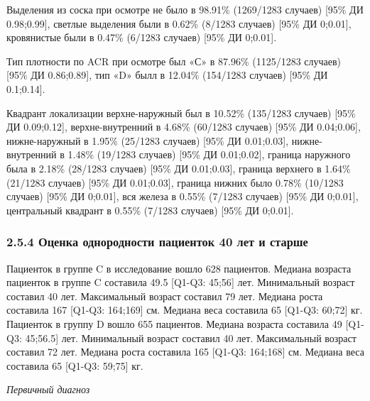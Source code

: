 \documentclass[
]{article}
\begin{document}
Выделения из соска при осмотре не было в 98.91\% (1269/1283 случаев)
{[}95\% ДИ 0.98;0.99{]}, светлые выделения были в 0.62\% (8/1283
случаев) {[}95\% ДИ 0;0.01{]}, кровянистые были в 0.47\% (6/1283
случаев) {[}95\% ДИ 0;0.01{]}.

Тип плотности по ACR при осмотре был «С» в 87.96\% (1125/1283 случаев)
{[}95\% ДИ 0.86;0.89{]}, тип «D» былл в 12.04\% (154/1283 случаев)
{[}95\% ДИ 0.1;0.14{]}.

Квадрант локализации верхне-наружный был в 10.52\% (135/1283 случаев)
{[}95\% ДИ 0.09;0.12{]}, верхне-внутренний в 4.68\% (60/1283 случаев)
{[}95\% ДИ 0.04;0.06{]}, нижне-наружный в 1.95\% (25/1283 случаев)
{[}95\% ДИ 0.01;0.03{]}, нижне-внутренний в 1.48\% (19/1283 случаев)
{[}95\% ДИ 0.01;0.02{]}, граница наружного была в 2.18\% (28/1283
случаев) {[}95\% ДИ 0.01;0.03{]}, граница верхнего в 1.64\% (21/1283
случаев) {[}95\% ДИ 0.01;0.03{]}, граница нижних было 0.78\% (10/1283
случаев) {[}95\% ДИ 0;0.01{]}, вся железа в 0.55\% (7/1283 случаев)
{[}95\% ДИ 0;0.01{]}, центральный квадрант в 0.55\% (7/1283 случаев)
{[}95\% ДИ 0;0.01{]}.

\hypertarget{ux43eux446ux435ux43dux43aux430-ux43eux434ux43dux43eux440ux43eux434ux43dux43eux441ux442ux438-ux43fux430ux446ux438ux435ux43dux442ux43eux43a-40-ux43bux435ux442-ux438-ux441ux442ux430ux440ux448ux435}{%
\subsubsection{2.5.4 Оценка однородности пациенток 40 лет и
старше}\label{ux43eux446ux435ux43dux43aux430-ux43eux434ux43dux43eux440ux43eux434ux43dux43eux441ux442ux438-ux43fux430ux446ux438ux435ux43dux442ux43eux43a-40-ux43bux435ux442-ux438-ux441ux442ux430ux440ux448ux435}}

Пациенток в группе C в исследование вошло 628 пациентов. Медиана
возраста пациенток в группе C составила 49.5 {[}Q1-Q3: 45;56{]} лет.
Минимальный возраст составил 40 лет. Максимальный возраст составил 79
лет. Медиана роста составила 167 {[}Q1-Q3: 164;169{]} см. Медиана веса
составила 65 {[}Q1-Q3: 60;72{]} кг. Пациенток в группу D вошло 655
пациентов. Медиана возраста составила 49 {[}Q1-Q3: 45;56.5{]} лет.
Минимальный возраст составил 40 лет. Максимальный возраст составил 72
лет. Медиана роста составила 165 {[}Q1-Q3: 164;168{]} см. Медиана веса
составила 65 {[}Q1-Q3: 59;75{]} кг.

\emph{Первичный диагноз}
\end{document}
